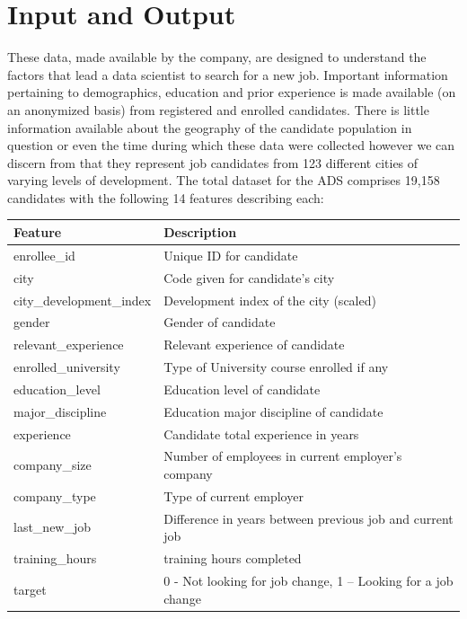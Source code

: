 \pagebreak

\section{Input and Output}

These data, made available by the company, are designed to understand the factors that lead a data scientist to search for a new job.  Important information pertaining to demographics, education and prior experience is made available (on an anonymized basis) from registered and enrolled candidates.  There is little information available about the geography of the candidate population in question or even the time during which these data were collected however we can discern from that they represent job candidates from 123 different cities of varying levels of development.  The total dataset for the ADS comprises 19,158 candidates with the following 14 features describing each:


\begin{table}[h]
\centering
\begin{tabular}{ |p{4cm}||p{10cm}|  }
 
 \hline
 Feature 		& Description		\\
 \hline
enrollee\_id 	& Unique ID for candidate\\
city			& Code given for candidate's city \\
city\_development\_index & Development index of the city (scaled)\\
gender		& Gender of candidate\\
relevant\_experience & Relevant experience of candidate\\
enrolled\_university & Type of University course enrolled if any \\

education\_level & Education level of candidate\\

major\_discipline & Education major discipline of candidate \\

experience 	& Candidate total experience in years\\

company\_size 	& Number of employees in current employer's company \\

company\_type 	& Type of current employer\\

last\_new\_job 	& Difference in years between previous job and current job \\

training\_hours 	& training hours completed \\

target 		& 0 - Not looking for job change, 1 – Looking for a job change\\
 \hline
\end{tabular}
\end{table}


